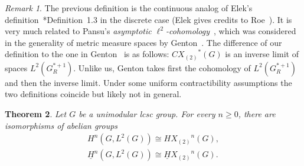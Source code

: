 \documentclass[10pt]{amsart}
\theoremstyle{plain}
\newtheorem{thm}{Theorem}
\theoremstyle{definition}
\theoremstyle{remark}
\newtheorem{rem}[thm]{Remark}
\begin{document}
\begin{rem}
The previous definition is the continuous analog of Elek's definition~\cite{elek}*{Definition~1.3} in the discrete case (Elek gives credits to Roe~\cite{roe}). 
It is very much related to Pansu's \emph{asymptotic $\ell^2$-cohomology}~\cite{pansu}, which was considered in the generality of metric measure spaces 
by Genton~\cite{genton}. The difference of our definition to the one in Genton~\cite{genton} is as follows: ${CX_{(2)}}^\ast(G)$ is an inverse limit of spaces $L^2(G^{\ast+1}_R)$. Unlike us, Genton takes first the cohomology of $L^2(G^{\ast+1}_R)$ and then the inverse limit. Under some uniform contractibility assumptions the two definitions coincide but likely not in general. 
\end{rem}

 \begin{thm}\label{iso of continuous and coarse coho}
 Let $G$ be a unimodular lcsc group. For every $n\ge 0$, there are isomorphisms of abelian groups 
 \begin{align*}
 H^n(G,L^2(G))\cong {HX_{(2)}}^n(G),\\
\underline{H}^n(G,L^2(G))\cong {\underline{H}X_{(2)}}^n(G).
 \end{align*}
\end{thm}
\end{document}
